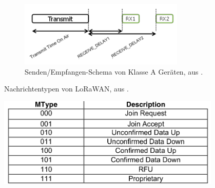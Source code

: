 \begin{figure}[h]
  \centering
	\includegraphics[width=0.7\textwidth]{images/sendrecv.png}
  \caption{Senden/Empfangen-Schema von Klasse A Geräten, aus \cite{lora2015spec}.}
  \label{fig:sendrecv}
\end{figure}

\begin{table}[h]
  \centering
  \caption{Nachrichtentypen von LoRaWAN, aus \cite{lora2015spec}.}
	\includegraphics[width=0.8\textwidth]{images/mtype.png}
  \label{table:mtype}
\end{table}


